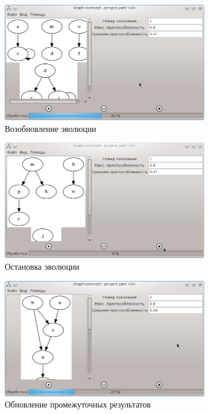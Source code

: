 \documentclass[russian,utf8,emptystyle]{eskdtext}
\begin{document}
\begin{figure}[h!]
\centering
\includegraphics[width=0.8\textwidth]{screen16}
\caption{Возобновление эволюции}
\label{fig:evolutionWndPauseStart}
\end{figure}

\begin{figure}[h!]
\centering
\includegraphics[width=0.8\textwidth]{screen17}
\caption{Остановка эволюции}
\label{fig:evolutionWndStop}
\end{figure}

\begin{figure}[h!]
\centering
\includegraphics[width=0.8\textwidth]{screen18}
\caption{Обновление промежуточных результатов}
\label{fig:evolutionWndNextGeneration}
\end{figure}
\end{document}
